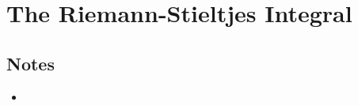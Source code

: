 \documentclass[../notes.tex]{subfiles}
\begin{document}
\chapter{The Riemann-Stieltjes Integral}
\section{Notes}
\begin{itemize}
    \item {}
\end{itemize}
\end{document}
